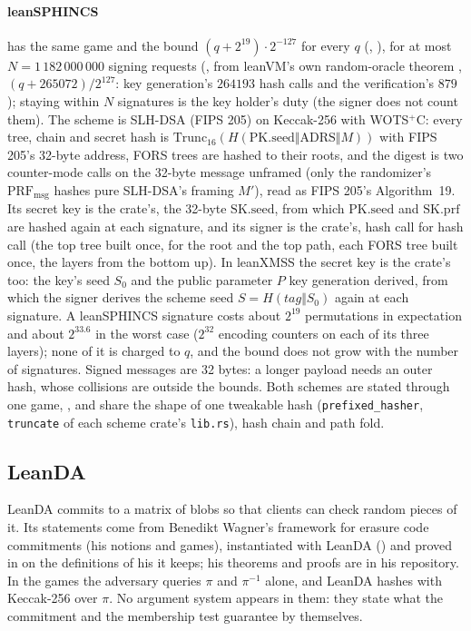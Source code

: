 \documentclass[11pt]{article}
\begin{document}
\paragraph{leanSPHINCS} has the same game and the bound $(q + 2^{19})\cdot 2^{-127}$ for every $q$
(, ), for at most
$N = 1\,182\,000\,000$ signing requests (, from
leanVM's own random-oracle theorem , $(q + 265072)/2^{127}$: key
generation's $264193$ hash calls and the verification's $879$); staying within $N$ signatures is the key holder's duty (the signer does not
count them). The scheme is SLH-DSA (FIPS 205) on Keccak-256 with WOTS$^+$C: every tree, chain and
secret hash is $\mathrm{Trunc}_{16}(H(\mathrm{PK.seed} \Vert \mathrm{ADRS} \Vert M))$ with FIPS 205's
32-byte address, FORS trees are hashed to their roots, and the digest is two counter-mode calls on
the 32-byte message unframed (only the randomizer's $\mathrm{PRF}_{\mathrm{msg}}$ hashes pure
SLH-DSA's framing $M'$), read as FIPS 205's Algorithm~19. Its secret key is the crate's, the
32-byte $\mathrm{SK.seed}$, from which $\mathrm{PK.seed}$ and $\mathrm{SK.prf}$ are hashed again at
each signature, and its signer is the
crate's, hash call for hash call (the top tree built once, for the root and the top path, each FORS
tree built once, the layers from the bottom up). In leanXMSS the secret key is the crate's too: the
key's seed $S_0$ and the public parameter $P$ key generation derived, from which the signer derives
the scheme seed $S = H(\mathit{tag} \Vert S_0)$ again at each signature. A leanSPHINCS signature
costs about $2^{19}$ permutations in expectation and about $2^{33.6}$ in the worst case ($2^{32}$
encoding counters on each of its three layers); none of it is charged to $q$, and the bound does not
grow with the number of signatures. Signed messages are 32 bytes: a longer payload needs an outer
hash, whose collisions are outside the bounds. Both schemes are stated through one game,
,
and share the shape of one tweakable hash (\texttt{prefixed\_hasher}, \texttt{truncate} of each
scheme crate's \texttt{lib.rs}), hash chain and path fold.

\subsection*{LeanDA}

LeanDA commits to a matrix of blobs so that clients can check random pieces of it. Its statements come from Benedikt Wagner's framework for erasure code commitments (his notions and games), instantiated with LeanDA () and proved in  on the definitions of his it keeps; his theorems and proofs are in his repository. In the games the adversary queries $\pi$ and $\pi^{-1}$ alone, and LeanDA hashes with Keccak-256 over $\pi$. No argument system appears in them: they state what the commitment and the membership test guarantee by themselves.
\end{document}
